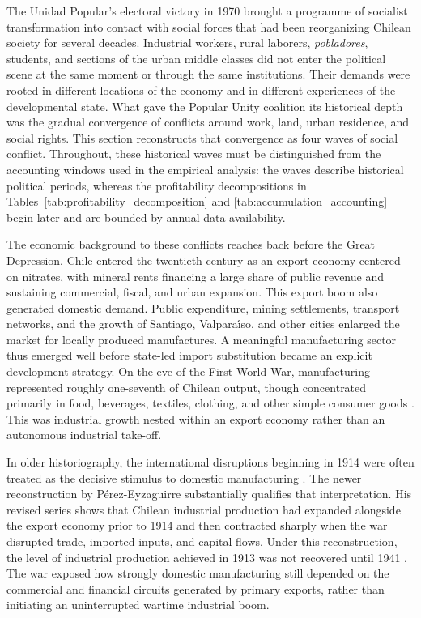 The Unidad Popular's electoral victory in 1970 brought a programme of socialist transformation into contact with social forces that had been reorganizing Chilean society for several decades. Industrial workers, rural laborers, \emph{pobladores}, students, and sections of the urban middle classes did not enter the political scene at the same moment or through the same institutions. Their demands were rooted in different locations of the economy and in different experiences of the developmental state. What gave the Popular Unity coalition its historical depth was the gradual convergence of conflicts around work, land, urban residence, and social rights. This section reconstructs that convergence as four waves of social conflict. Throughout, these historical waves must be distinguished from the accounting windows used in the empirical analysis: the waves describe historical political periods, whereas the profitability decompositions in Tables~\ref{tab:profitability_decomposition} and \ref{tab:accumulation_accounting} begin later and are bounded by annual data availability.

The economic background to these conflicts reaches back before the Great Depression. Chile entered the twentieth century as an export economy centered on nitrates, with mineral rents financing a large share of public revenue and sustaining commercial, fiscal, and urban expansion. This export boom also generated domestic demand. Public expenditure, mining settlements, transport networks, and the growth of Santiago, Valpara\'{\i}so, and other cities enlarged the market for locally produced manufactures. A meaningful manufacturing sector thus emerged well before state-led import substitution became an explicit development strategy. On the eve of the First World War, manufacturing represented roughly one-seventh of Chilean output, though concentrated primarily in food, beverages, textiles, clothing, and other simple consumer goods \citep{BulmerThomas2010}. This was industrial growth nested within an export economy rather than an autonomous industrial take-off.

In older historiography, the international disruptions beginning in 1914 were often treated as the decisive stimulus to domestic manufacturing \citep{Palma1984}. The newer reconstruction by P\'erez-Eyzaguirre substantially qualifies that interpretation. His revised series shows that Chilean industrial production had expanded alongside the export economy prior to 1914 and then contracted sharply when the war disrupted trade, imported inputs, and capital flows. Under this reconstruction, the level of industrial production achieved in 1913 was not recovered until 1941 \citep{PerezEyzaguirre2025}. The war exposed how strongly domestic manufacturing still depended on the commercial and financial circuits generated by primary exports, rather than initiating an uninterrupted wartime industrial boom.

